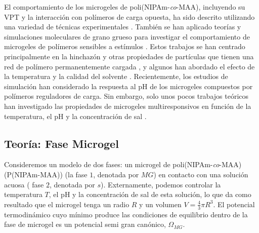 El comportamiento de los microgeles de poli(NIPAm-\emph{co}-MAA), incluyendo su VPT y la interacci\'on con pol\'imeros de carga opuesta, ha sido descrito utilizando una variedad de t\'ecnicas experimentales \cite{Hoare2004,Dowding2000,Kleinen2008,Kleinen2010,Giussi2015,Su2016,Giussi2020}.
Tambi\'en se han aplicado teor\'ias y simulaciones moleculares de grano grueso para investigar el comportamiento de microgeles de pol\'imeros sensibles a est\'imulos \cite{quesada2011gel,ahualli2016coarse,Landsgesell2019SM}.
Estos trabajos se han centrado principalmente en la hinchaz\'on y otras propiedades de part\'iculas que tienen una red de pol\'imero permanentemente cargada \cite{Levin2002,Claudio2009,Colla2014,Jha2011,jha2012understanding,QuesadaPerez2013,QuesadaPerez2014,Kobayashi2014,Kobayashi2016,Rizzi2016,moncho-jorda2016a,Kobayashi2017,AdroherBenitez2017PCCP}, y algunos han abordado el efecto de la temperatura y la calidad del solvente \cite{Jha2011,QuesadaPerez2013,QuesadaPerez2014,moncho-jorda2016a,ahualli2016coarse,AdroherBenitez2017PCCP}.
Recientemente, los estudios de simulaci\'on han considerado la respuesta al pH de los microgeles compuestos por pol\'imeros reguladores de carga\cite{Schroeder2015,Rudov2017,Sean2018,Hofzumahaus2018,Lu2019}.
Sin embargo, solo unos pocos trabajos te\'oricos han investigado las propiedades de microgeles multiresponsivos en funci\'on de la temperatura, el pH y la concentraci\'on de sal \cite{CaprilesGonzalez2008,polotsky2013collapse}.



\subsection{Teor\'ia: Fase Microgel}\label{sec:gel:theory}


Consideremos un modelo de dos fases: un microgel de poli(NIPAm-\emph{co}-MAA) (P(NIPAm-MAA)) (la fase $1$, denotada por $MG$) en contacto con una soluci\'on acuosa ( fase $2$, denotada por $s$).
Externamente, podemos controlar la temperatura $T$, el pH y la concentraci\'on de sal de esta soluci\'on, lo que da como resultado que el microgel tenga un radio $R$ y un volumen $V=\frac{4}{3}\pi R^3$.
El potencial termodin\'amico cuyo m\'inimo produce las condiciones de equilibrio dentro de la fase de microgel es un  potencial semi gran can\'onico, $\Omega_{MG}$.


